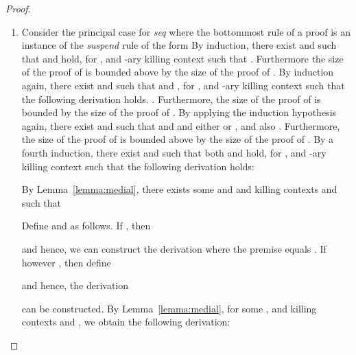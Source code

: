 \begin{proof}
\begin{enumerate}[label=\textbf{\Alph*},ref=\Alph*,leftmargin=*]
\begin{enumerate}[label*=\textbf{.\arabic*}]
Furthermore,
the size of the proof of formula

is bounded above by the size of the proof of
, hence the induction hypothesis is enabled.
By the induction hypothesis, there exists  and  such that  and , for , and -ary killing context  such that

Furthermore, by Lemma~\ref{lemma:medial} there exist killing contexts  and  and sets of integers ,  such that

Thereby, the following derivation can be constructed.

Furthermore, the following two proofs can be constructed.

By Lemma~\ref{lemma:bound}, 

which are also upper bounds for

and
.
Furthermore,  and  both  and  
Hence the sizes of the above proofs of 
 
and 

 are strictly less than the size of the proof of .



\item Consider the principal case for \textit{seq} where the bottommost rule of a proof is an instance of the \textit{suspend} rule of the form
 By induction, there exist  and  such that  and  hold, for ,
and -ary killing context  such that 
.
Furthermore the size of the proof of  is bounded above by the size of the proof of .
By induction again, there exist  and  such that  and , for , and -ary killing context  such that the following derivation holds.
.
Furthermore, the size of the proof of  is bounded by the size of the proof of . 
By applying the induction hypothesis again, there exist  and  such that  and  and either  or , and also
.
Furthermore, the size of the proof of  is bounded above by the size of the proof of .
By a fourth induction, there exist  and  such that both  and  hold, for , and -ary killing context  such that the following derivation holds:

By Lemma~\ref{lemma:medial}, there exists some  and  and killing contexts  and  such that

Define  and  as follows.
If , then 

and hence, we can construct the derivation 
 where the premise equals .
If however , then define

and hence, the derivation 

can be constructed.
By Lemma~\ref{lemma:medial}, for some ,  and killing contexts  and , we obtain the following derivation:


\end{enumerate}
\end{enumerate}
\end{proof}
